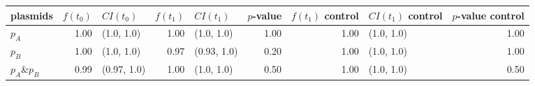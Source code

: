 \begin{tabular}{lrlrlrrlr}
\toprule
plasmids & $f(t_0)$ & $CI(t_0)$ & $f(t_1)$ & $CI(t_1)$ & $p$-value & $f(t_1)$ control & $CI(t_1)$ control & $p$-value control \\
\midrule
$p_A$ & 1.00 & (1.0, 1.0) & 1.00 & (1.0, 1.0) & 1.00 & 1.00 & (1.0, 1.0) & 1.00 \\
$p_B$ & 1.00 & (1.0, 1.0) & 0.97 & (0.93, 1.0) & 0.20 & 1.00 & (1.0, 1.0) & 1.00 \\
$p_A$\&$p_B$ & 0.99 & (0.97, 1.0) & 1.00 & (1.0, 1.0) & 0.50 & 1.00 & (1.0, 1.0) & 0.50 \\
\bottomrule
\end{tabular}
